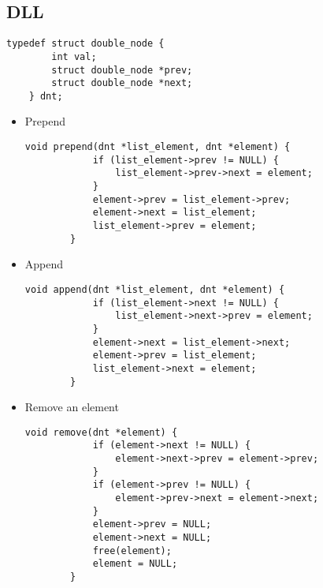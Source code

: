\documentclass{article}
\begin{document}
\subsection{DLL}
\begin{lstlisting}[style=CStyle]
    typedef struct double_node {
        int val;
        struct double_node *prev;
        struct double_node *next;
    } dnt;
\end{lstlisting}
\begin{itemize}
    \item Prepend
    \begin{lstlisting}[style=CStyle]
        void prepend(dnt *list_element, dnt *element) {
            if (list_element->prev != NULL) {
                list_element->prev->next = element;
            }
            element->prev = list_element->prev;
            element->next = list_element;
            list_element->prev = element;
        }
    \end{lstlisting}
    \item Append
    \begin{lstlisting}[style=CStyle]
        void append(dnt *list_element, dnt *element) {
            if (list_element->next != NULL) {
                list_element->next->prev = element;
            }
            element->next = list_element->next;
            element->prev = list_element;
            list_element->next = element;
        }
    \end{lstlisting}
    \item Remove an element
    \begin{lstlisting}[style=CStyle]
        void remove(dnt *element) {
            if (element->next != NULL) {
                element->next->prev = element->prev;
            }
            if (element->prev != NULL) {
                element->prev->next = element->next;
            }
            element->prev = NULL;
            element->next = NULL;
            free(element);
            element = NULL;
        }
    \end{lstlisting}

\end{itemize}
\end{document}
